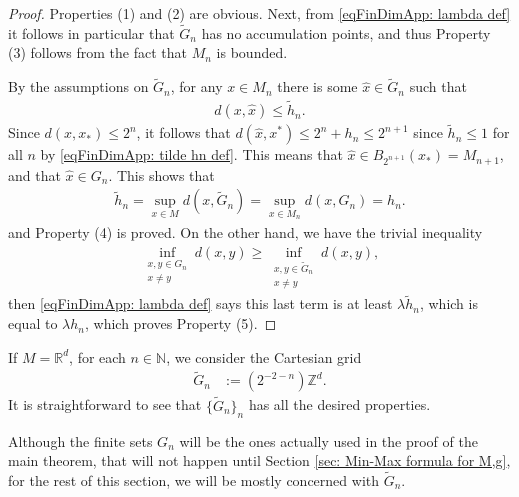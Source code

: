 \documentclass[11pt,reqno]{amsart}
\numberwithin{equation}{section}
\theoremstyle{plain}
\begin{document}
  \begin{proof}
    Properties (1) and (2) are obvious.  Next, from \eqref{eqFinDimApp: lambda def} it follows in particular that $\tilde G_n$ has no accumulation points, and thus Property (3) follows from the fact that $M_n$ is bounded.
	
    By the assumptions on $\tilde G_n$, for any $x\in M_n$ there is some $\hat x \in \tilde G_n$ such that
    \begin{align*}	 
      d(x,\hat x)\leq \tilde h_n.	
    \end{align*}	
    Since $d(x,x_*)\leq 2^n$, it follows that $d(\hat x,x^*)\leq 2^n+h_n\leq 2^{n+1}$ since $\tilde h_n\leq 1$ for all $n$ by \eqref{eqFinDimApp: tilde hn def}. This means that $\hat x\in B_{2^{n+1}}(x_*) = M_{n+1}$, and that $\hat x\in G_n$. This shows that   		
    \begin{align*}
      \tilde h_n = \sup \limits_{x \in M}d(x,\tilde G_n) = \sup \limits_{x\in M_n}d(x,G_n) = h_n.
    \end{align*}			
    and Property (4) is proved.  On the other hand, we have the trivial inequality 
    \begin{align*}
      \inf \limits_{\substack{x,y\in G_n \\ x\neq y}} d(x,y)  \geq \inf \limits_{\substack{x,y\in \tilde G_n \\ x\neq y}} d(x,y),
    \end{align*}		
    then \eqref{eqFinDimApp: lambda def} says this last term is at least $\lambda \tilde h_n$, which is equal to $\lambda h_n$, which proves Property (5).
  \end{proof}

  \begin{rem} If $M=\mathbb{R}^d$, for each $n\in\mathbb{N}$, we consider the Cartesian grid
    \begin{align*}
      \tilde G_n & := ( 2^{-2-n})\mathbb{Z}^d.
    \end{align*}	  
    It is straightforward to see that $\{\tilde G_n\}_n$ has all the desired properties.
  \end{rem}
  
  \begin{rem} Although the finite sets $G_n$ will be the ones actually used in the proof of the main theorem, that will not happen until Section \ref{sec: Min-Max formula for M,g}, for the rest of this section, we will be mostly concerned with $\tilde G_n$.
  \end{rem}
  
\end{document}
